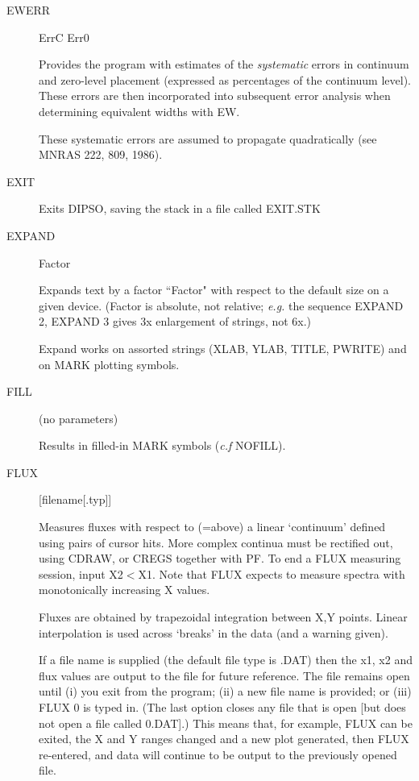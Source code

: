 \begin {description}
\item [EWERR] ErrC Err0

Provides the program with estimates of the {\em systematic} errors in
continuum and zero-level placement (expressed as percentages of the
continuum level). These errors are then incorporated into subsequent
error analysis when determining equivalent widths with EW.

These systematic errors are assumed to propagate quadratically (see
MNRAS 222, 809, 1986).

\item [EXIT]

Exits DIPSO, saving the stack in a file called EXIT.STK

\item [EXPAND] Factor

Expands text by a factor ``Factor" with respect to the default size on
a given device. (Factor is absolute, not relative;  {\em e.g.} the
sequence EXPAND 2, EXPAND 3 gives 3x enlargement of strings, not 6x.)

Expand works on assorted strings (XLAB, YLAB, TITLE, PWRITE) and on
MARK plotting symbols.

\item [FILL] (no parameters)

Results in filled-in MARK symbols ({\it c.f} NOFILL).

\item [FLUX] [filename[.typ]] 

Measures fluxes with respect to (=above) a linear `continuum' defined
using pairs of cursor hits. More complex continua must be rectified
out, using CDRAW, or CREGS together with PF. To end a FLUX measuring
session, input X2$<$X1. Note that FLUX expects to measure spectra with
monotonically increasing X values.

Fluxes are obtained by trapezoidal integration between X,Y points.
Linear interpolation is used across `breaks' in the data (and a
warning given).

If a file name is supplied (the default file type is .DAT) then the
x1, x2 and flux values are output to the file for future reference.
The file remains open until (i) you exit from the program; (ii) a new
file name is provided; or (iii) FLUX 0 is typed in. (The last option
closes any file that is open [but does not open a file called 0.DAT].)
This means that, for example, FLUX can be exited, the X and Y ranges
changed and a new plot generated, then FLUX re-entered, and data will
continue to be output to the previously opened file.


\end{description}
